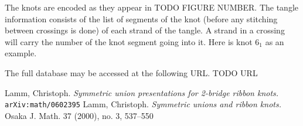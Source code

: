 \begin{paper}
The knots are encoded as they appear in TODO FIGURE NUMBER.
The tangle information consists of the list of segments of the knot (before any
stitching between crossings is done) of each strand of the tangle.
A strand in a crossing will carry the number of the knot segment going into it.
Here is knot $6_1$ as an example.


The full database may be accessed at the following URL.
TODO URL
\begin{thebibliography}{}
Lamm, Christoph.
\textit{Symmetric union presentations for 2-bridge ribbon knots.}
\texttt{arXiv:math/0602395}
Lamm, Christoph.
\textit{Symmetric unions and ribbon knots.}
Osaka J. Math. 37 (2000), no. 3, 537--550
\end{thebibliography}
\end{paper}

